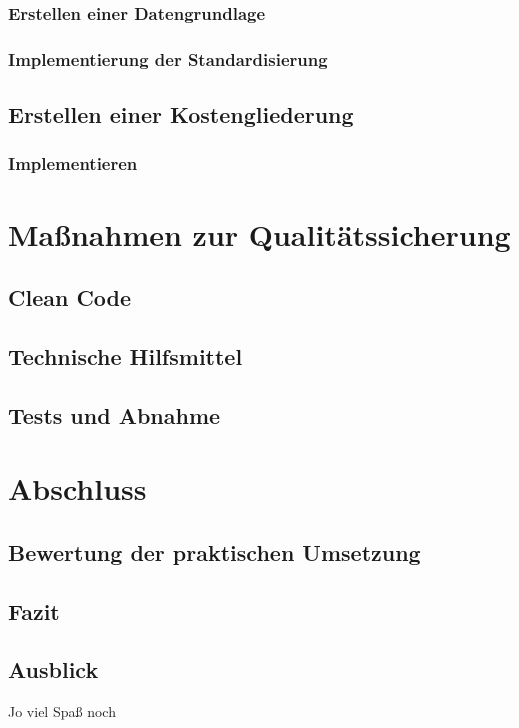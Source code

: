 \subsubsection{Erstellen einer Datengrundlage}
\subsubsection{Implementierung der Standardisierung}

\subsection{Erstellen einer Kostengliederung}
\subsubsection{Implementieren}

\section{Maßnahmen zur Qualitätssicherung}
\subsection{Clean Code}
\subsection{Technische Hilfsmittel}
\subsection{Tests und Abnahme}

\section{Abschluss}
\subsection{Bewertung der praktischen Umsetzung}
\subsection{Fazit}
\subsection{Ausblick}
 Jo viel Spaß noch
